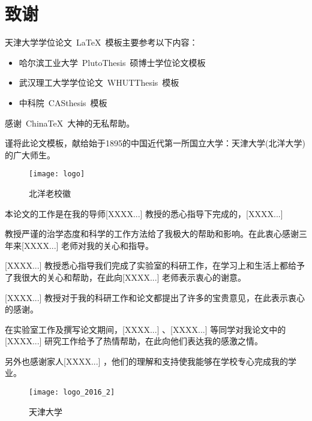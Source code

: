 
\chapter*{致\quad 谢}

天津大学学位论文~\LaTeX~模板主要参考以下内容：
\begin{itemize}
  \item 哈尔滨工业大学~PlutoThesis~硕博士学位论文模板
  \item 武汉理工大学学位论文~WHUTThesis~模板
  \item 中科院~CASthesis~模板
\end{itemize}

感谢~ChinaTeX~大神的无私帮助。

谨将此论文模板，献给始于1895的中国近代第一所国立大学：天津大学(北洋大学)的广大师生。
\begin{figure}[htbp]
\centering
\texttt{[image: logo]}
\caption{北洋老校徽}\label{fig:oldlogo}
\end{figure}

\vspace*{1cm}
本论文的工作是在我的导师[XXXX...] 教授的悉心指导下完成的，[XXXX...]

教授严谨的治学态度和科学的工作方法给了我极大的帮助和影响。在此衷心感谢三年来[XXXX...] 老师对我的关心和指导。

[XXXX...] 教授悉心指导我们完成了实验室的科研工作，在学习上和生活上都给予了我很大的关心和帮助，在此向[XXXX...] 老师表示衷心的谢意。

[XXXX...] 教授对于我的科研工作和论文都提出了许多的宝贵意见，在此表示衷心的感谢。

在实验室工作及撰写论文期间，[XXXX...] 、[XXXX...] 等同学对我论文中的[XXXX...] 研究工作给予了热情帮助，在此向他们表达我的感激之情。

另外也感谢家人[XXXX...] ，他们的理解和支持使我能够在学校专心完成我的学业。

\begin{figure}[htbp]
\centering
\texttt{[image: logo\_2016\_2]}
\caption{天津大学}\label{fig:newlogo}
\end{figure}

